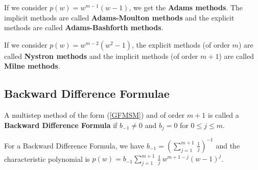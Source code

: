 \begin{rmk}
If we consider $p(w) = w^{m-1}(w-1)$,
we get the {\bfseries Adams methods}.
The implicit methods are called 
{\bfseries Adams-Moulton methods} and the explicit methods are called 
{\bfseries Adams-Bashforth methods}.

If we consider $p(w) = w^{m-2}(w^2-1)$, the explicit methods (of order
$m$) are called
{\bfseries Nystron methods}
and the implicit methods (of order $m+1$) are called
{\bfseries Milne methods}.
\end{rmk}

\subsection{Backward Difference Formulae}

\begin{defn}
A multistep method of the form (\ref{GFMSM}) and of order $m+1$ is
called a
{\bfseries Backward Difference Formula}
if $b_{-1} \neq 0$ and $b_j=0$ for $0 \leq j \leq m$.
\end{defn}

\begin{prop}
For a Backward Difference Formula, we have
$\displaystyle b_{-1} = \left(\sum_{j=1}^{m+1}\,\frac{1}{j} \right)^{-1}$
and the characteristic polynomial is
$\displaystyle p(w) = b_{-1}\sum_{j=1}^{m+1}\,\frac{1}{j}\,w^{m+1-j}(w-1)^j$.
\end{prop}

